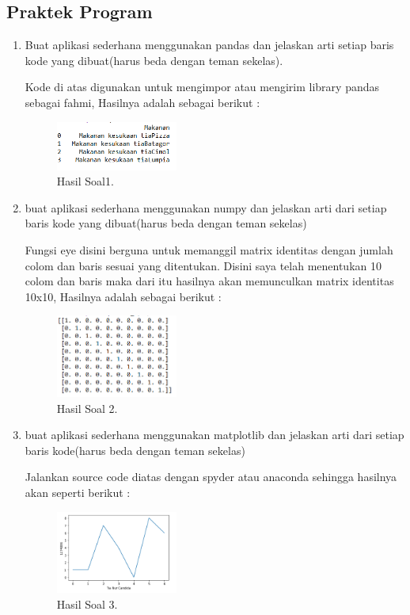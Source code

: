 \subsection{Praktek Program}
\begin{enumerate}
	\item Buat aplikasi sederhana menggunakan pandas dan jelaskan arti setiap baris kode yang dibuat(harus beda dengan teman sekelas).
	\hfill\break
	
	Kode di atas digunakan untuk mengimpor atau mengirim library pandas sebagai fahmi, Hasilnya adalah sebagai berikut :
	\begin{figure}[H]
	\centering
		\includegraphics[width=4cm]{figures/1174086/3/hasil1.PNG}
		\caption{Hasil Soal1.}
	\end{figure}

	\item buat aplikasi sederhana menggunakan numpy dan jelaskan arti dari setiap baris kode yang dibuat(harus beda dengan teman sekelas)
	\hfill\break
	
	Fungsi eye disini berguna untuk memanggil matrix identitas dengan jumlah colom dan baris sesuai yang ditentukan. Disini saya telah menentukan 10 colom dan baris maka dari itu hasilnya akan memunculkan matrix identitas 10x10, Hasilnya adalah sebagai berikut :
	\begin{figure}[H]
	\centering
		\includegraphics[width=4cm]{figures/1174086/3/hasilsoal2.PNG}
		\caption{Hasil Soal 2.}
	\end{figure}
	
	\item buat aplikasi sederhana menggunakan matplotlib dan jelaskan arti dari setiap baris kode(harus beda dengan teman sekelas)
	\hfill\break
	
	Jalankan source code diatas dengan spyder atau anaconda sehingga hasilnya akan seperti berikut : 

	\begin{figure}[H]
	\centering
		\includegraphics[width=4cm]{figures/1174086/3/hasilsoal3.PNG}
		\caption{Hasil Soal 3.}
	\end{figure}


\end{enumerate}
